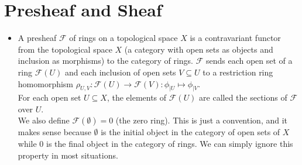 \documentclass[15pt]{scrartcl}
\newcommand{\cF}{\mathcal{F}}
\begin{document}
\section{Presheaf and Sheaf }
\begin{itemize}
    \subsection{Presheaf and Sheaf}
    \item A presheaf $\cF$ of rings on a topological space $X$ is a contravariant functor from the topological space $X$ (a category with open sets as objects and inclusion as morphisms) to the category of rings. $\cF$ sends each open set of a ring $\cF(U)$ and each inclusion of open sets $V\subseteq U$ to a restriction ring homomorphism $\rho_{U,V}:\cF(U)\to \cF(V) : \phi_{\mid U} \mapsto \phi_{\mid V}$.
    \\
    For each open set $U\subseteq X$, the elements of $\cF(U)$ are called the sections of $\cF$ over $U$. 
    \\

    We also define $\cF(\emptyset)=0$ (the zero ring). This is just a convention, and it makes sense because $\emptyset$ is the initial object in the category of open sets of $X$ while $0$ is the final object in the category of rings. We can simply ignore this property in most situations.
    \\
    

\end{itemize}
\end{document}
